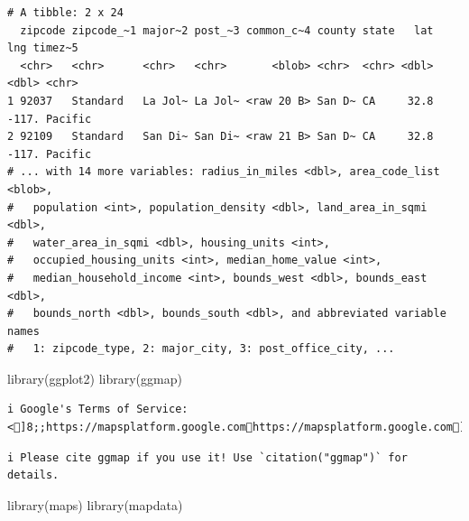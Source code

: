 \documentclass[
  letterpaper,
  DIV=11,
  numbers=noendperiod]{scrartcl}
\newenvironment{Shaded}{\begin{snugshade}}{\end{snugshade}}
\newcommand{\CommentTok}[1]{\textcolor[rgb]{0.37,0.37,0.37}{#1}}
\newcommand{\FunctionTok}[1]{\textcolor[rgb]{0.28,0.35,0.67}{#1}}
\newcommand{\NormalTok}[1]{\textcolor[rgb]{0.00,0.23,0.31}{#1}}
\newcommand{\OtherTok}[1]{\textcolor[rgb]{0.00,0.23,0.31}{#1}}
\newcommand{\SpecialCharTok}[1]{\textcolor[rgb]{0.37,0.37,0.37}{#1}}
\begin{document}
\begin{verbatim}
# A tibble: 2 x 24
  zipcode zipcode_~1 major~2 post_~3 common_c~4 county state   lat   lng timez~5
  <chr>   <chr>      <chr>   <chr>       <blob> <chr>  <chr> <dbl> <dbl> <chr>  
1 92037   Standard   La Jol~ La Jol~ <raw 20 B> San D~ CA     32.8 -117. Pacific
2 92109   Standard   San Di~ San Di~ <raw 21 B> San D~ CA     32.8 -117. Pacific
# ... with 14 more variables: radius_in_miles <dbl>, area_code_list <blob>,
#   population <int>, population_density <dbl>, land_area_in_sqmi <dbl>,
#   water_area_in_sqmi <dbl>, housing_units <int>,
#   occupied_housing_units <int>, median_home_value <int>,
#   median_household_income <int>, bounds_west <dbl>, bounds_east <dbl>,
#   bounds_north <dbl>, bounds_south <dbl>, and abbreviated variable names
#   1: zipcode_type, 2: major_city, 3: post_office_city, ...
\end{verbatim}

\begin{Shaded}
\end{Shaded}

\begin{Shaded}
\end{Shaded}

\begin{Shaded}
\begin{Highlighting}[]
\FunctionTok{library}\NormalTok{(ggplot2)}
\FunctionTok{library}\NormalTok{(ggmap)}
\end{Highlighting}
\end{Shaded}

\begin{verbatim}
i Google's Terms of Service: <]8;;https://mapsplatform.google.comhttps://mapsplatform.google.com]8;;>
\end{verbatim}

\begin{verbatim}
i Please cite ggmap if you use it! Use `citation("ggmap")` for details.
\end{verbatim}

\begin{Shaded}
\begin{Highlighting}[]
\FunctionTok{library}\NormalTok{(maps)}
\FunctionTok{library}\NormalTok{(mapdata)}
\end{Highlighting}
\end{Shaded}
\end{document}

